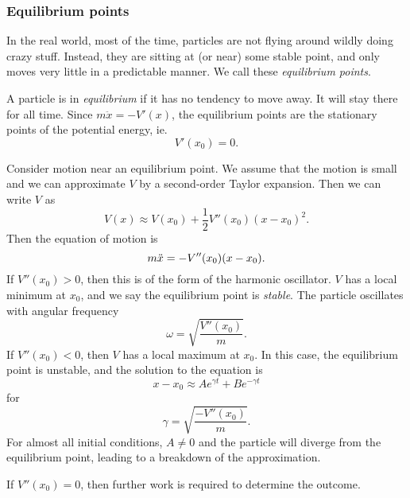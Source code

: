 \documentclass[a4paper]{article}
\begin{document}
\subsubsection*{Equilibrium points}
In the real world, most of the time, particles are not flying around wildly doing crazy stuff. Instead, they are sitting at (or near) some stable point, and only moves very little in a predictable manner. We call these \emph{equilibrium points}.

\begin{defi}
  A particle is in \emph{equilibrium} if it has no tendency to move away. It will stay there for all time. Since $m\ddot{x} = -V'(x)$, the equilibrium points are the stationary points of the potential energy, ie.
  \[
    V'(x_0) = 0.
  \]
\end{defi}
Consider motion near an equilibrium point. We assume that the motion is small and we can approximate $V$ by a second-order Taylor expansion. Then we can write $V$ as
\[
  V(x) \approx V(x_0) + \frac{1}{2}V''(x_0)(x - x_0)^2.
\]
Then the equation of motion is
\[
  m\ddot{x} = -V''(x_0)(x - x_0).\\
\]
If $V''(x_0) > 0$, then this is of the form of the harmonic oscillator. $V$ has a local minimum at $x_0$, and we say the equilibrium point is \emph{stable}. The particle oscillates with angular frequency
\[
  \omega = \sqrt{\frac{V''(x_0)}{m}}.
\]
If $V''(x_0) < 0$, then $V$ has a local maximum at $x_0$. In this case, the equilibrium point is unstable, and the solution to the equation is
\[
  x - x_0 \approx Ae^{\gamma t} + Be^{-\gamma t}
\]
for
\[
  \gamma = \sqrt{\frac{-V''(x_0)}{m}}.
\]
For almost all initial conditions, $A \not= 0$ and the particle will diverge from the equilibrium point, leading to a breakdown of the approximation.

If $V''(x_0) = 0$, then further work is required to determine the outcome.
\end{document}
